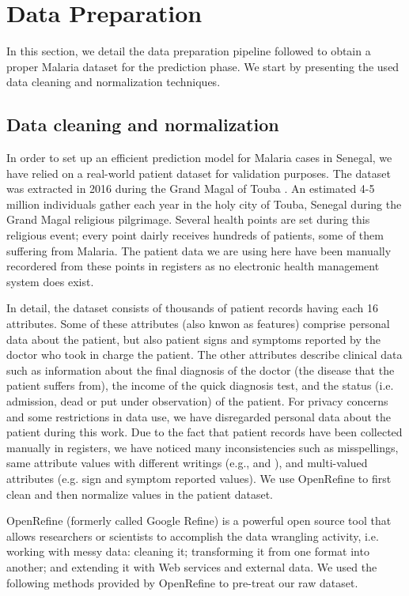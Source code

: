 \section{Data Preparation}\label{data_prep}
In this section, we detail the data preparation pipeline followed to obtain a proper Malaria dataset for the prediction phase.
We start by presenting the used data cleaning and normalization techniques.


\subsection{Data cleaning and normalization}
In order to set up an efficient prediction model for Malaria cases in Senegal, we have relied on a real-world patient dataset
for validation purposes. The dataset was extracted in 2016 during the Grand Magal of Touba \cite{}. 
An estimated 4-5 million individuals gather each year in the holy city of Touba, Senegal during the Grand Magal religious pilgrimage.
Several health points are set during this religious event; every point dairly receives hundreds of patients, some of them 
suffering from Malaria. The patient data we are using here have been manually recordered from these points in registers as no electronic
health management system does exist.  

In detail, the dataset consists of thousands of patient records having each 16 attributes. Some of these
attributes (also knwon as features) comprise personal data about the patient, but also patient signs and symptoms
reported by the doctor who took in charge the patient. The other attributes describe clinical data such as information about the final diagnosis
of the doctor (the disease that the patient suffers from), the income of the quick diagnosis test, and the status (i.e. admission, 
dead or put under observation) of the patient. For privacy concerns and some restrictions in data use, we have disregarded personal data about
the patient during this work. Due to the fact that patient records have been collected manually in registers, we have noticed many inconsistencies 
such as misspellings, same attribute values with different writings (e.g.,  and ),
 and multi-valued attributes (e.g. sign and symptom reported values). We use OpenRefine \cite{Ku16,openRefine} to first clean and then normalize values in the patient dataset.

OpenRefine (formerly called Google Refine) is a powerful open source tool that allows researchers or scientists to accomplish the data wrangling activity, i.e. 
working with messy data: cleaning it; transforming it from one format into another; and extending it with Web services and external data.    
We used the following methods provided by OpenRefine to pre-treat our raw dataset.

